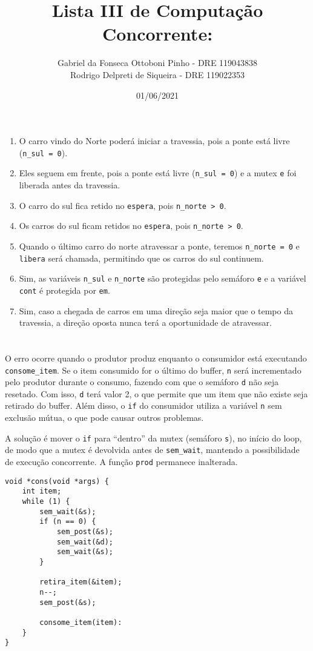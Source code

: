 \documentclass[12pt]{article}
\title{Lista III de Computação Concorrente:}
\author{Gabriel da Fonseca Ottoboni Pinho - DRE 119043838\\
	Rodrigo Delpreti de Siqueira - DRE 119022353}
\date{01/06/2021}
\begin{document}
\maketitle

\section{}
\begin{enumerate}
	\item
		O carro vindo do Norte poderá iniciar a travessia,
		pois a ponte está livre
		(\texttt{n\_sul = 0}).
	\item
		Eles seguem em frente,
		pois a ponte está livre
		(\texttt{n\_sul = 0}) e
		a mutex \texttt{e}
		foi liberada antes da travessia.
	\item
		O carro do sul fica retido
		no \texttt{espera},
		pois \texttt{n\_norte > 0}.
	\item
		Os carros do sul ficam retidos
		no \texttt{espera},
		pois \texttt{n\_norte > 0}.
	\item
		Quando o último carro do norte
		atravessar a ponte,
		teremos \texttt{n\_norte = 0} e
		\texttt{libera} será chamada,
		permitindo que os carros do sul continuem.
	\item
		Sim,
		as variáveis \texttt{n\_sul} e \texttt{n\_norte}
		são protegidas pelo semáforo \texttt{e} e
		a variável \texttt{cont} é protegida por \texttt{em}.
	\item
		Sim,
		caso a chegada de carros
		em uma direção seja
		maior que o tempo da travessia,
		a direção oposta
		nunca terá a oportunidade de atravessar.
\end{enumerate}

\newpage
\section{}
O erro ocorre quando o
produtor produz enquanto o
consumidor está executando \texttt{consome\_item}.
Se o item consumido for o último do buffer,
\texttt{n} será incrementado pelo produtor
durante o consumo,
fazendo com que o semáforo \texttt{d}
não seja resetado.
Com isso,
\texttt{d} terá valor 2,
o que permite que um
item que não existe seja
retirado do buffer.
Além disso,
o \texttt{if} do consumidor
utiliza a variável \texttt{n}
sem exclusão mútua,
o que pode causar outros problemas.

A solução é
mover o \texttt{if} para
``dentro'' da mutex (semáforo \texttt{s}),
no início do loop,
de modo que a mutex é
devolvida antes de \texttt{sem\_wait},
mantendo a possibilidade de
execução concorrente.
A função \texttt{prod}
permanece inalterada.
\begin{verbatim}
void *cons(void *args) {
	int item;
	while (1) {
		sem_wait(&s);
		if (n == 0) {
			sem_post(&s);
			sem_wait(&d);
			sem_wait(&s);
		}

		retira_item(&item);
		n--;
		sem_post(&s);

		consome_item(item):
	}
}
\end{verbatim}
\end{document}
